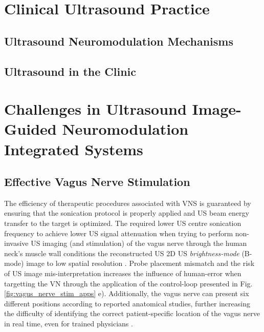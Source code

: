 \section{Clinical Ultrasound Practice}
\label{sec:clinical_ultrasound_practice}

\subsection{Ultrasound Neuromodulation Mechanisms}
\label{subsec:ultrasound_neuromodulation_mechanisms}

\subsection{Ultrasound in the Clinic}
\label{subsec:ultrasound_in_the_clinic}



\section{Challenges in Ultrasound Image-Guided Neuromodulation Integrated Systems}
\label{sec:problem_definition}

\subsection{Effective Vagus Nerve Stimulation}
\label{subsec:effective_vagus_nerve_stimulation}

The efficiency of therapeutic procedures associated with VNS is guaranteed by
ensuring that the sonication protocol is properly applied and US beam energy transfer 
to the target is optimized. The required lower US centre sonication frequency to achieve lower US signal attenuation when trying to perform non-invasive US imaging
(and stimulation) of the vagus nerve through the human neck's muscle
wall conditions the reconstructed US 2D US \textit{brightness-mode} (B-mode) image to low spatial resolution \cite{Szabo2014_1_8_2_Ultrasound}. Probe placement mismatch and the risk of US image mis-interpretation increases the influence of human-error when
targetting the VN through the application of the control-loop
presented in Fig. \ref{fig:vagus_nerve_stim_apps} e). Additionally, 
the vagus nerve can present six different positions according to reported 
anatomical studies, further increasing the difficulty of identifying the correct 
patient-specific location of the vagus nerve in real time, 
even for trained physicians \cite{}.

